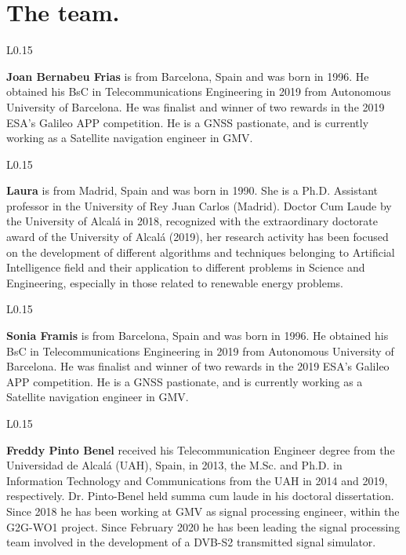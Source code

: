 
\section{The team.}
\begin{wrapfigure}{L}{0.15\textwidth}
    \end{wrapfigure}
\textbf{Joan Bernabeu Frias} is from Barcelona, Spain and was born in 1996. He obtained his BsC in Telecommunications Engineering in 2019 from Autonomous University of Barcelona. He was finalist and winner of two rewards in the 2019 ESA's Galileo APP competition. He is a GNSS pastionate, and is currently working as a Satellite navigation engineer in GMV.\\

\begin{wrapfigure}{L}{0.15\textwidth}
    \end{wrapfigure}
\textbf{Laura} is from Madrid, Spain and was born in 1990. She is a Ph.D. Assistant professor in the University of Rey Juan Carlos (Madrid). Doctor Cum Laude by the University of Alcalá in 2018, recognized with the extraordinary doctorate award of the University of Alcalá (2019), her research activity has been focused on the development of different algorithms and techniques belonging to Artificial Intelligence field and their application to different problems in Science and Engineering, especially in those related to renewable energy problems.\\

\begin{wrapfigure}{L}{0.15\textwidth}
    \end{wrapfigure}
\textbf{Sonia Framis} is from Barcelona, Spain and was born in 1996. He obtained his BsC in Telecommunications Engineering in 2019 from Autonomous University of Barcelona. He was finalist and winner of two rewards in the 2019 ESA's Galileo APP competition. He is a GNSS pastionate, and is currently working as a Satellite navigation engineer in GMV.\\
\newpage
\begin{wrapfigure}{L}{0.15\textwidth}
    \end{wrapfigure}
\textbf{Freddy Pinto Benel} received his Telecommunication Engineer degree from the Universidad de Alcalá (UAH), Spain, in 2013, the M.Sc. and Ph.D. in Information Technology and Communications from the UAH in 2014 and 2019, respectively. Dr. Pinto-Benel held summa cum laude in his doctoral dissertation. Since 2018 he has been working at GMV as signal processing engineer, within the G2G-WO1 project. Since February 2020 he has been leading the signal processing team involved in the development of a DVB-S2 transmitted signal simulator.\\


